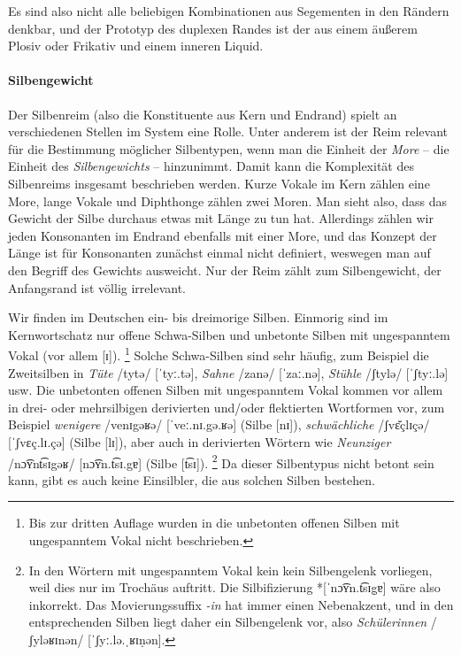 Es sind also nicht alle beliebigen Kombinationen aus Segementen in den Rändern denkbar, und der Prototyp des duplexen Randes ist der aus einem äußerem Plosiv oder Frikativ und einem inneren Liquid.

\paragraph*{Silbengewicht}

Der Silbenreim (also die Konstituente aus Kern und Endrand) spielt an verschiedenen Stellen im System eine Rolle.
Unter anderem ist der Reim relevant für die Bestimmung möglicher Silbentypen, wenn man die Einheit der \textit{More} -- die Einheit des \textit{Silbengewichts} -- hinzunimmt.
Damit kann die Komplexität des Silbenreims insgesamt beschrieben werden.
Kurze Vokale im Kern zählen eine More, lange Vokale und Diphthonge zählen zwei Moren.
Man sieht also, dass das Gewicht der Silbe durchaus etwas mit Länge zu tun hat.
Allerdings zählen wir jeden Konsonanten im Endrand ebenfalls mit einer More, und das Konzept der Länge ist für Konsonanten zunächst einmal nicht definiert, weswegen man auf den Begriff des Gewichts ausweicht.
Nur der Reim zählt zum Silbengewicht, der Anfangsrand ist völlig irrelevant.

Wir finden im Deutschen ein- bis dreimorige Silben.
Einmorig sind im Kernwortschatz nur offene Schwa-Silben und unbetonte Silben mit ungespanntem Vokal (vor allem [ɪ]).%
\footnote{Bis zur dritten Auflage wurden in  die unbetonten offenen Silben mit ungespanntem Vokal nicht beschrieben.}
Solche Schwa-Silben sind sehr häufig, zum Beispiel die Zweitsilben in \textit{Tüte} /tytə/ [ˈtyː.tə], \textit{Sahne} /zanə/ [ˈzaː.nə], \textit{Stühle} /ʃtylə/ [ˈʃtyː.lə] usw.
Die unbetonten offenen Silben mit ungespanntem Vokal kommen vor allem in drei- oder mehrsilbigen derivierten und\slash oder flektierten Wortformen vor, zum Beispiel \textit{wenigere} /venɪgəʁə/ [ˈveː.nɪ.gə.ʁə] (Silbe [nɪ]), \textit{schwächliche} /ʃvɛ̆çlɪçə/ [ˈʃvɛç.lɪ.çə] (Silbe [lɪ]), aber auch in derivierten Wörtern wie \textit{Neunziger} /nɔ͡ʏnt͡sɪgəʁ/ [nɔ͡ʏn.t͡sɪ.gɐ] (Silbe [t͡sɪ]).%
\footnote{In den Wörtern mit ungespanntem Vokal kein kein Silbengelenk vorliegen, weil dies nur im Trochäus auftritt.
Die Silbifizierung *[ˈnɔ͡ʏn.t͡sɪg̣ɐ] wäre also inkorrekt.
Das Movierungssuffix \textit{-in} hat immer einen Nebenakzent, und in den entsprechenden Silben liegt daher ein Silbengelenk vor, also \textit{Schülerinnen} /ʃyləʁɪnən/ [ˈʃyː.lə.ˌʁɪṇən].}
Da dieser Silbentypus nicht betont sein kann, gibt es auch keine Einsilbler, die aus solchen Silben bestehen.

